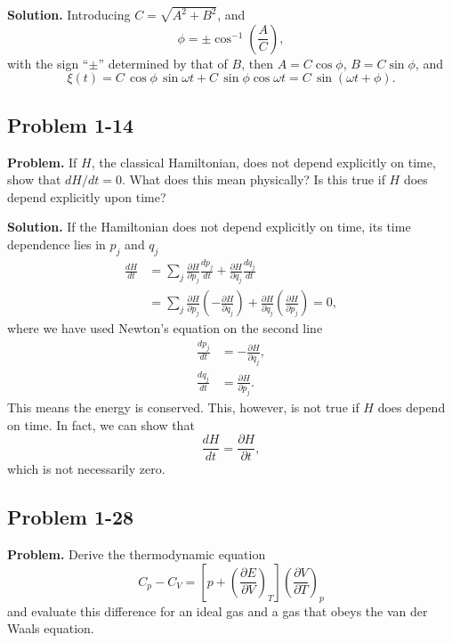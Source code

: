 \documentclass[twocolumn, 10pt]{article}
\numberwithin{equation}{section}
\newenvironment{problem}
{\par\medskip\sffamily \color{problue}
  \textbf{Problem. }\ignorespaces}
{\medskip}
\newenvironment{solution}
{\par\medskip
  \textbf{Solution. }\ignorespaces}
{\medskip}
\begin{document}
\begin{solution}
Introducing $C = \sqrt{A^2 + B^2}$,
and
$$\phi = \pm \cos^{-1} \left( \frac A C \right),$$
with the sign ``$\pm$'' determined by that of $B$,
then $A = C \cos\phi$, $B = C \sin\phi$, and
$$
\xi(t) = C \, \cos\phi \, \sin \omega t + C \, \sin\phi \cos \omega t
= C \, \sin(\omega t + \phi).
$$
\end{solution}


\subsection{Problem 1-14}

\begin{problem}
If $H$, the classical Hamiltonian, does not depend explicitly on time,
show that $dH/dt = 0$.
What does this mean physically?
Is this true if $H$ does depend explicitly upon time?
\end{problem}

\begin{solution}
If the Hamiltonian does not depend explicitly on time,
its time dependence lies in $p_j$ and $q_j$
\begin{align*}
  \frac{dH}{dt}
  &= \sum_j
  \frac{ \partial H } { \partial p_j}
  \frac{ d p_j } { d t }
   +
  \frac{ \partial H } { \partial q_j}
  \frac{ d q_j } { d t }
  \\
  &= \sum_j
  \frac{ \partial H } { \partial p_j}
  \left( - \frac{ \partial H } { \partial q_j} \right)
   +
  \frac{ \partial H } { \partial q_j}
  \left( \frac{ \partial H } { \partial p_j} \right)
  = 0,
\end{align*}
where we have used Newton's equation
on the second line
\begin{align*}
  \frac{ d p_j } { d t }
  &=
  - \frac{ \partial H } { \partial q_j}
  ,
  \\
  \frac{ d q_j } { d t }
  &= \frac{ \partial H } { \partial p_j}
  .
\end{align*}
This means the energy is conserved.
This, however, is not true if $H$ does depend on time.
%
In fact, we can show that
$$
  \frac{ d H } { d t }
  =
  \frac{ \partial H } { \partial t }
  ,
$$
which is not necessarily zero.
\end{solution}


\subsection{Problem 1-28}

\begin{problem}
  Derive the thermodynamic equation
  $$
  C_p - C_V
  = \left[ p + \left( \frac{ \partial E } { \partial V } \right)_T \right]
  \left( \frac{ \partial V } { \partial T } \right)_p
  $$
  and evaluate this difference for an ideal gas
  and a gas that obeys the van der Waals equation.
\end{problem}
\end{document}
